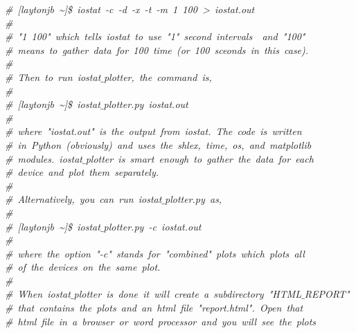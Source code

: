 \mbox{}\textit{\#\ [laytonjb\ \textasciitilde{}]\$\ iostat\ -c\ -d\ -x\ -t\ -m\ 1\ 100\ \textgreater{}\ iostat.out} \\
\mbox{}\textit{\#} \\
\mbox{}\textit{\#\ "{}1\ 100"{}\ which\ tells\ iostat\ to\ use\ "{}1"{}\ second\ intervals\ \ and\ "{}100"{}\ } \\
\mbox{}\textit{\#\ means\ to\ gather\ data\ for\ 100\ time\ (or\ 100\ sceonds\ in\ this\ case).} \\
\mbox{}\textit{\#} \\
\mbox{}\textit{\#\ Then\ to\ run\ iostat$\_$plotter,\ the\ command\ is,} \\
\mbox{}\textit{\#} \\
\mbox{}\textit{\#\ [laytonjb\ \textasciitilde{}]\$\ iostat$\_$plotter.py\ iostat.out} \\
\mbox{}\textit{\#} \\
\mbox{}\textit{\#\ where\ "{}iostat.out"{}\ is\ the\ output\ from\ iostat.\ The\ code\ is\ written} \\
\mbox{}\textit{\#\ in\ Python\ (obviously)\ and\ uses\ the\ shlex,\ time,\ os,\ and\ matplotlib} \\
\mbox{}\textit{\#\ modules.\ iostat$\_$plotter\ is\ smart\ enough\ to\ gather\ the\ data\ for\ each} \\
\mbox{}\textit{\#\ device\ and\ plot\ them\ separately.} \\
\mbox{}\textit{\#} \\
\mbox{}\textit{\#\ Alternatively,\ you\ can\ run\ iostat$\_$plotter.py\ as,} \\
\mbox{}\textit{\#} \\
\mbox{}\textit{\#\ [laytonjb\ \textasciitilde{}]\$\ iostat$\_$plotter.py\ -c\ iostat.out} \\
\mbox{}\textit{\#} \\
\mbox{}\textit{\#\ where\ the\ option\ "{}-c"{}\ stands\ for\ "{}combined"{}\ plots\ which\ plots\ all} \\
\mbox{}\textit{\#\ of\ the\ devices\ on\ the\ same\ plot.} \\
\mbox{}\textit{\#} \\
\mbox{}\textit{\#\ When\ iostat$\_$plotter\ is\ done\ it\ will\ create\ a\ subdirectory\ "{}HTML$\_$REPORT"{}} \\
\mbox{}\textit{\#\ that\ contains\ the\ plots\ and\ an\ html\ file\ "{}report.html"{}.\ Open\ that} \\
\mbox{}\textit{\#\ html\ file\ in\ a\ browser\ or\ word\ processor\ and\ you\ will\ see\ the\ plots} \\

